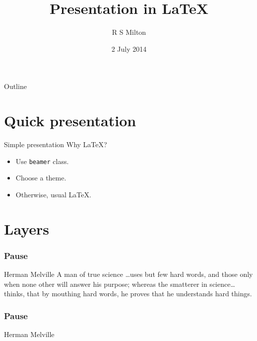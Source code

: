 \documentclass[11pt]{beamer}
\title{Presentation in LaTeX}
\author{R S Milton}
\institute{
  Department of Computer Science\\
  SSN College of Engineering
}
\date{2 July 2014}
\begin{document}
\begin{frame}
  \titlepage
\end{frame}

\begin{frame}{Outline}
  \tableofcontents
\end{frame}


\section{Quick presentation}

\begin{frame}{Simple presentation}
  Why LaTeX?\\
  \begin{itemize}
  \item Use \texttt{beamer} class.
  \item Choose a theme.
  \item Otherwise, usual LaTeX.
  \end{itemize}
\end{frame}

\section[Stepwise]{Layers}

\begin{frame}
  \frametitle{Pause}
  \begin{block}{Herman Melville}
    A man of true science \ldots \pause uses but few hard words,
    \pause and those only when none other will answer his
    purpose; \pause whereas the smatterer in science\ldots
    \pause thinks, that by mouthing hard words, he proves that
    he understands hard things.
  \end{block}
\end{frame}

\begin{frame}
  \frametitle{Pause}
  \begin{block}{Herman Melville}
  \end{block}
\end{frame}
\end{document}
